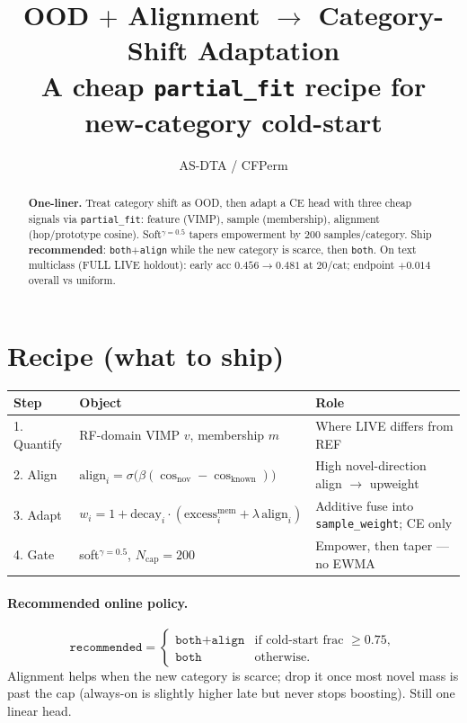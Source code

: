 \documentclass[11pt]{article}
\title{OOD $+$ Alignment $\to$ Category-Shift Adaptation\\
\large A cheap \texttt{partial\_fit} recipe for new-category cold-start}
\author{AS-DTA / CFPerm}
\date{}
\begin{document}
\maketitle

\begin{abstract}
\noindent
\textbf{One-liner.}
Treat category shift as OOD, then adapt a CE head with three cheap
signals via \texttt{partial\_fit}: feature (VIMP), sample (membership),
alignment (hop/prototype cosine). Soft$^{\gamma=0.5}$ tapers empowerment
by $200$ samples/category. Ship \textbf{recommended}:
\texttt{both$+$align} while the new category is scarce, then
\texttt{both}.
On text multiclass (FULL LIVE holdout): early acc
$0.456\to\mathbf{0.481}$ at $20$/cat; endpoint
$\mathbf{+0.014}$ overall vs uniform.
\end{abstract}

\section{Recipe (what to ship)}

\begin{center}
\small
\begin{tabular}{@{}llp{7.0cm}@{}}
\toprule
Step & Object & Role \\
\midrule
1. Quantify
  & RF-domain VIMP $v$, membership $m$
  & Where LIVE differs from REF \\
2. Align
  & $\mathrm{align}_i=\sigma\!\big(\beta(\cos_{\mathrm{nov}}-\cos_{\mathrm{known}})\big)$
  & High novel-direction align $\to$ upweight \\
3. Adapt
  & $w_i=1+\mathrm{decay}_i\cdot(\mathrm{excess}^{\mathrm{mem}}_i+\lambda\,\mathrm{align}_i)$
  & Additive fuse into \texttt{sample\_weight}; CE only \\
4. Gate
  & soft$^{\gamma=0.5}$, $N_{\mathrm{cap}}=200$
  & Empower, then taper --- no EWMA \\
\bottomrule
\end{tabular}
\end{center}

\paragraph{Recommended online policy.}
\begin{equation*}
  \texttt{recommended}
  =
  \begin{cases}
    \texttt{both$+$align}
      & \text{if cold-start frac }\ge 0.75,\\
    \texttt{both}
      & \text{otherwise.}
  \end{cases}
\end{equation*}
Alignment helps when the new category is scarce; drop it once most novel
mass is past the cap (always-on is slightly higher late but never stops
boosting). Still one linear head.
\end{document}
